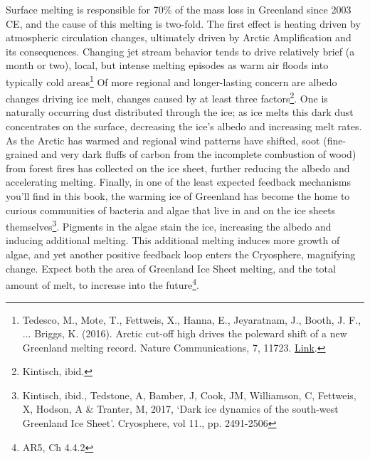 Surface melting is responsible for 70\% of the mass loss in Greenland since 2003 CE, and the cause of this melting is two-fold. The first effect is heating driven by atmospheric circulation changes, ultimately driven by Arctic Amplification and its consequences. Changing jet stream behavior tends to drive relatively brief (a month or two), local, but intense melting episodes as warm air floods into typically cold areas\footnote{Tedesco, M., Mote, T., Fettweis, X., Hanna, E., Jeyaratnam, J., Booth, J. F., ... Briggs, K. (2016). Arctic cut-off high drives the poleward shift of a new Greenland melting record. Nature Communications, 7, 11723. \href{https://doi.org/10.1038/ncomms11723}{Link}.} Of more regional and longer-lasting concern are albedo changes driving ice melt, changes caused by at least three factors\footnote{Kintisch, ibid.}. One is naturally occurring dust distributed through the ice; as ice melts this dark dust concentrates on the surface, decreasing the ice's albedo and increasing melt rates. As the Arctic has warmed and regional wind patterns have shifted, soot (fine-grained and very dark fluffs of carbon from the incomplete combustion of wood) from forest fires has collected on the ice sheet, further reducing the albedo and accelerating melting. Finally, in one of the least expected feedback mechanisms you'll find in this book, the warming ice of Greenland has become the home to curious communities of bacteria and algae that live in and on the ice sheets themselves\footnote{Kintisch, ibid., Tedstone, A, Bamber, J, Cook, JM, Williamson, C, Fettweis, X, Hodson, A \& Tranter, M, 2017, `Dark ice dynamics of the south-west Greenland Ice Sheet'. Cryosphere, vol 11., pp. 2491-2506}. Pigments in the algae stain the ice, increasing the albedo and inducing additional melting. This additional melting induces more growth of algae, and yet another positive feedback loop enters the Cryosphere, magnifying change. Expect both the area of Greenland Ice Sheet melting, and the total amount of melt, to increase into the future\footnote{AR5, Ch 4.4.2}. \\
